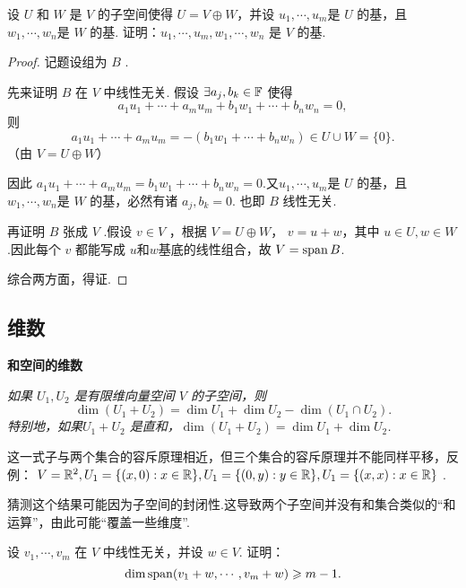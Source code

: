 \documentclass[cn,hazy,blue,14pt,screen]{elegantnote}
\begin{document}
\begin{problem}
    设 $U$ 和 $W$ 是 $V$ 的子空间使得 $U=V\oplus W$，并设 $u_1,\cdots,u_m$是 $U$ 的基，且 $w_1,\cdots,w_n$是 $W$ 的基. 证明：$u_1,\cdots,u_m,w_1,\cdots,w_n$ 是 $V$ 的基.
\end{problem}

\begin{proof}
    记题设组为 $B$ . 
    
    先来证明 $B$ 在 $V$ 中线性无关. 假设 $\exists a_j, b_k \in \mathbb{F}$ 使得
    $$
    a_1u_1+\cdots+a_mu_m+b_1w_1+\cdots+b_nw_n=0,
    $$
    则
    $$
    a_1u_1+\cdots+a_mu_m=-(b_1w_1+\cdots+b_nw_n) \in U\cup W = \{0\}.
    $$ （由 $V=U\oplus W$）

    因此 $a_1u_1+\cdots+a_mu_m=b_1w_1+\cdots+b_nw_n=0$.又$u_1,\cdots,u_m$是 $U$ 的基，且 $w_1,\cdots,w_n$是 $W$ 的基，必然有诸 $a_j,b_k=0$. 也即 $B$ 线性无关.

    再证明 $B$ 张成 $V$ .假设 $v\in V$ ，根据 $V=U\oplus W$， $v=u+w$，其中 $u\in U, w\in W$ .因此每个 $v$ 都能写成 $u$和$w$基底的线性组合，故 $V=\operatorname{span} B$.

    综合两方面，得证.
\end{proof}

\subsection{维数}

\begin{theorem}
    \normalfont \textbf{和空间的维数}

    \itshape 如果 $U_1,U_2$ 是有限维向量空间 $V$ 的子空间，则
    $$
    \dim (U_1+U_2) = \dim U_1 + \dim U_2 - \dim (U_1 \cap U_2).
    $$
    特别地，如果$U_1+U_2$ 是直和，$\dim (U_1+U_2) = \dim U_1 + \dim U_2$.
    \begin{remark}
        这一式子与两个集合的容斥原理相近，但三个集合的容斥原理并不能同样平移，反例： $V=\mathbb{R}^2,U_1=\{(x,0):x\in\mathbb{R}\},U_1=\{(0,y):y\in\mathbb{R}\},U_1=\{(x,x):x\in\mathbb{R}\}$ .

        猜测这个结果可能因为子空间的封闭性.这导致两个子空间并没有和集合类似的“和运算”，由此可能“覆盖一些维度”.
    \end{remark}
\end{theorem}

\Sep

\begin{problem}
    设 $v_1,\cdots,v_m$ 在 $V$ 中线性无关，并设 $w\in V$. 证明：
    $$
    \dim \operatorname{span} (v_1+w,\cdots,v_m+w) \geqslant m-1.
    $$
\end{problem}
\end{document}

